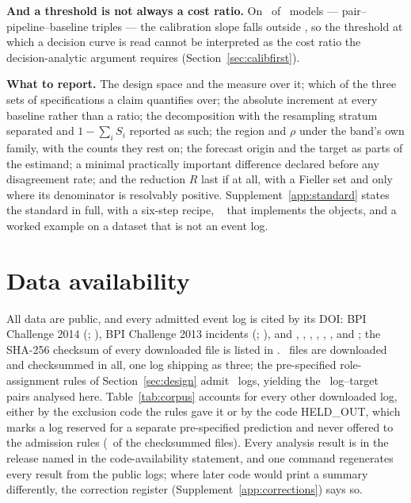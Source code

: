 \documentclass[11pt,3p,review,authoryear]{elsarticle}
\theoremstyle{definition}
\begin{document}
\textbf{And a threshold is not always a cost ratio.} On \nModelsDcaExcluded\
of \nModelsDca\ models --- pair--pipeline--baseline triples --- the
calibration slope falls outside \calSlopeWindow, so the threshold at which a
decision curve is read cannot be interpreted as the cost ratio the
decision-analytic argument requires (Section~\ref{sec:calibfirst}).

\textbf{What to report.} The design space and the measure over it; which of
the three sets of specifications a claim quantifies over; the absolute
increment at every baseline rather than a ratio; the decomposition with the
resampling stratum separated and $1 - \sum_i S_i$ reported as such; the region
and $\rho$ under the band's own family, with the counts they rest on; the
forecast origin and the target as parts of the estimand; a minimal
practically important difference declared before any disagreement rate; and
the reduction $R$ last if at all, with a Fieller set and only where its
denominator is resolvably positive. Supplement~\ref{app:standard} states the
standard in full, with a six-step recipe, \pkgname\ \citep{fieldvalue} that
implements the objects, and a worked example on a dataset that is not an
event log.

\section*{Data availability}

All data are public, and every admitted event log is cited by its DOI: BPI
Challenge 2014 (\doiBPICfourteen; \citealp{vandongen2014bpic}), BPI Challenge
2013 incidents (\doiBPICthirteen; \citealp{steeman2013bpic}), and
\citet{steeman2013closed}, \citet{vandongen2015bpic}, \citet{vandongen2017bpic},
\citet{vandongen2019bpic}, \citet{polato2017helpdesk},
\citet{deleoni2015roadfines}, \citet{mannhardt2016sepsis} and
\citet{amaral2018incident}; the SHA-256 checksum of every downloaded file is
listed in \checksumfile. \nCorpusDownloaded\ files are downloaded and checksummed in
all, one log shipping as three; the pre-specified role-assignment rules of
Section~\ref{sec:design} admit \nLogs\ logs, yielding the \nPairs\
log--target pairs analysed here. Table~\ref{tab:corpus} accounts for every
other downloaded log, either by the exclusion code the rules gave it or by
the code \textsf{HELD\_OUT}, which marks a log reserved for a separate
pre-specified prediction and never offered to the admission rules
(\nHeldOutLogs\ of the checksummed files). Every analysis result is in the
release named in the code-availability statement, and one command
regenerates every result from the public logs; where later code would
print a summary differently, the correction register
(Supplement~\ref{app:corrections}) says so.
\end{document}
